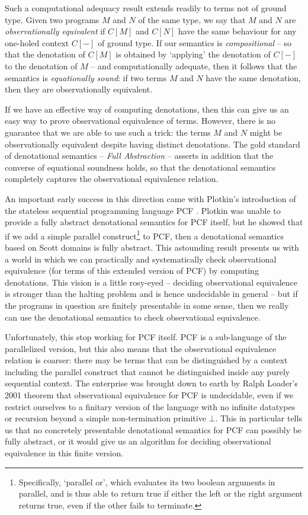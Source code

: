 Such a computational adequacy result extends readily to terms not of ground type.  
Given two programs $M$ and $N$ of the same type, we say that $M$ and $N$ are \emph{observationally equivalent} if $C[M]$ and $C[N]$ have the same behaviour for any one-holed context $C[-]$ of ground type.
If our semantics is \emph{compositional} -- so that the denotation of $C[M]$ is obtained by `applying' the denotation of $C[-]$ to the denotation of $M$ -- and computationally adequate, then it follows that the semantics is \emph{equationally sound}: if two terms $M$ and $N$ have the same denotation, then they are observationally equivalent.

If we have an effective way of computing denotations, then this can give us an easy way to prove observational equivalence of terms.  
However, there is no guarantee that we are able to use such a trick: the terms $M$ and $N$ might be observationally equivalent despite having distinct denotations.  
The gold standard of denotational semantics -- \emph{Full Abstraction} -- asserts in addition that the converse of equational soundness holds, so that the denotational semantics completely captures the observational equivalence relation.  

An important early success in this direction came with Plotkin's introduction of the stateless sequential programming language PCF \cite{PlotkinPcf}.  
Plotkin was unable to provide a fully abstract denotational semantics for PCF itself, but he showed that if we add a simple parallel construct\footnote{Specifically, `parallel or', which evaluates its two boolean arguments in parallel, and is thus able to return true if either the left or the right argument returns true, even if the other fails to terminate.} to PCF, then a denotational semantics based on Scott domains is fully abstract.  
This astounding result presents us with a world in which we can practically and systematically check observational equivalence (for terms of this extended version of PCF) by computing denotations.  
This vision is a little rosy-eyed -- deciding observational equivalence is stronger than the halting problem and is hence undecidable in general -- but if the programs in question are finitely presentable in some sense, then we really can use the denotational semantics to check observational equivalence.

Unfortunately, this stop working for PCF itself.  
PCF is a sub-language of the parallelized version, but this also means that the observational equivalence relation is coarser: there may be terms that can be distinguished by a context including the parallel construct that cannot be distinguished inside any purely sequential context.  
The enterprise was brought down to earth by Ralph Loader's 2001 theorem that observational equivalence for PCF is undecidable, even if we restrict ourselves to a finitary version of the language with no infinite datatypes or recursion beyond a simple non-termination primitive $\bot$.
This in particular tells us that no concretely presentable denotational semantics for PCF can possibly be fully abstract, or it would give us an algorithm for deciding observational equivalence in this finite version.

